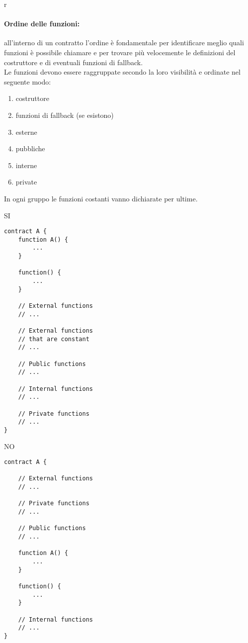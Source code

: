 r\documentclass[../ProcessiPrimari.tex]{subfiles}
\begin{document}
\paragraph*{Ordine delle funzioni: }
all'interno di un contratto l'ordine è fondamentale per identificare meglio quali funzioni è possibile chiamare e per trovare più velocemente le definizioni del costruttore e di eventuali funzioni di fallback.\\
Le funzioni devono essere raggruppate secondo la loro visibilità e ordinate nel seguente modo:
\begin{enumerate}
\item costruttore
\item funzioni di fallback (se esistono)
\item esterne
\item pubbliche
\item interne
\item private
\end{enumerate}
In ogni gruppo le funzioni costanti vanno dichiarate per ultime.
\begin{center}{
\begin{minipage}{6cm}
{\begin{center}SI\end{center}}
\begin{Verbatim}[frame=single]
contract A {
    function A() {
        ...
    }

    function() {
        ...
    }

    // External functions
    // ...

    // External functions 
    // that are constant
    // ...

    // Public functions
    // ...

    // Internal functions
    // ...

    // Private functions
    // ...
}
\end{Verbatim}
\end{minipage}
\hfill
\begin{minipage}{6cm}
{\begin{center}NO\end{center}}
\begin{Verbatim}[frame=single]
contract A {

    // External functions
    // ...

    // Private functions
    // ...

    // Public functions
    // ...

    function A() {
        ...
    }

    function() {
        ...
    }

    // Internal functions
    // ...
}



\end{Verbatim}
\end{minipage}
}
\end{center}
\end{document}
